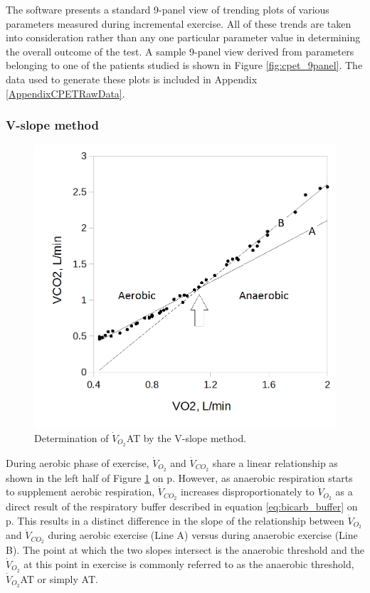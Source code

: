 The software presents a standard 9-panel view of trending plots of various parameters measured during incremental exercise. All of these trends are taken into consideration rather than any one particular parameter value in determining the overall outcome of the test. A sample 9-panel view derived from parameters belonging to one of the patients studied is shown in Figure \ref{fig:cpet_9panel}. The data used to generate these plots is included in Appendix \ref{AppendixCPETRawData}. 

\subsubsection{V-slope method}

\begin{figure}[htbp]
	\centering
	\includegraphics[width=\textwidth]{Figures/cpet_vslope}
	\caption{Determination of $\dot{V}_{O_2}$AT by the V-slope method.}
	\label{fig:cpet_vslope}
\end{figure}

During aerobic phase of exercise, $\dot{V}_{O_2}$ and $\dot{V}_{CO_2}$ share a linear relationship as shown in the left half of Figure \ref{fig:cpet_vslope} on p\pageref{fig:cpet_vslope}. However, as anaerobic respiration starts to supplement aerobic respiration, $\dot{V}_{CO_2}$ increases disproportionately to $\dot{V}_{O_2}$ as a direct result of the respiratory buffer described in equation \ref{eq:bicarb_buffer} on p\pageref{eq:bicarb_buffer}. This results in a distinct difference in the slope of the relationship between $\dot{V}_{O_2}$ and $\dot{V}_{CO_2}$ during aerobic exercise (Line A) versus during anaerobic exercise (Line B). The point at which the two slopes intersect is the anaerobic threshold and the $\dot{V}_{O_2}$ at this point in exercise is commonly referred to as the anaerobic threshold, $\dot{V}_{O_2}$AT or simply AT. 

